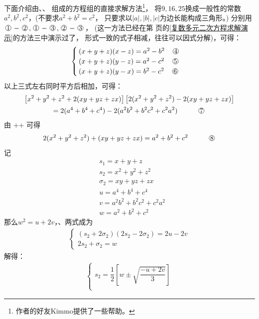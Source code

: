 \begin{enumerate}[label={【\textbf{例\thechapter.\arabic*}】},
 leftmargin=\inteval{\myenumleftmargin}pt,
 itemsep=\inteval{\myenumitempsep}pt,
 itemindent=\inteval{\myenumitemindent}pt]
下面介绍由、、
组成的方程组的直接求解方法\footnote{作者的好友Kimmo提供了一些帮助。}，
将$ 9,16,25 $换成一般性的常数$ a^2,b^2,c^2 $，(不要求$ a^2+b^2=c^2 $，
只要求以$ |a|,|b|,|c| $为边长能构成三角形。)
分别用$ \mycircled{1}-\mycircled{2},
\mycircled{1}-\mycircled{3},\mycircled{2}-\mycircled{3} $，
(这一方法已经在第\pageref{复数多元二次方程求解演示} 
页的\ref{复数多元二次方程求解演示}的方法三中演示过了，
形式一致的式子相减，往往可以因式分解)，可得：
\begin{align*}
    \begin{cases}
        (x+y+z)(x-z)= a^2-b^2 \q \mycircled{4}  \\
        (x+y+z)(y-z)= a^2-c^2 \q \mycircled{5}  \\
        (x+y+z)(y-x)= b^2-c^2 \q \mycircled{6} 
    \end{cases}
\end{align*}
以上三式左右同时平方后相加，可得：
\begin{gather*}
    \left[ x^2+y^2+z^2+2(xy+yz+zx) \right] \left[ 2(x^2+y^2+z^2)-2(xy+yz+zx) \right] \\
    =2(a^4+b^4+c^4)-2(a^2b^2+b^2c^2+c^2a^2) \hspace{1cm} \mycircled{7}
\end{gather*}
由 ++ 可得
\begin{align*}
    2(x^2+y^2+z^2)+(xy+yz+zx)=a^2+b^2+c^2  \hspace{1cm} \mycircled{8}
\end{align*}
记
\begin{align*}
    & s_1=x+y+z \\
    & s_2=x^2+y^2+z^2 \\
    & \sigma_2=xy+yz+zx  \\
    & u=a^4+b^4+c^4 \\
    & v=a^2b^2+b^2c^2+c^2a^2 \\
    & w=a^2+b^2+c^2
\end{align*}
那么$ w^2=u+2v $，、两式成为
\begin{align*}
    \begin{cases}
        (s_2+2\sigma_2)(2s_2-2\sigma_2)= 2u-2v \\
        2s_2+\sigma_2 = w
    \end{cases}
\end{align*}
解得：
\begin{align*}
    \begin{cases}
        s_2 = \dfrac{1}{2}\left[w \pm \sqrt{\dfrac{-u+2v}{3}}\right] \\

\end{cases}
\end{align*}
\end{enumerate}
